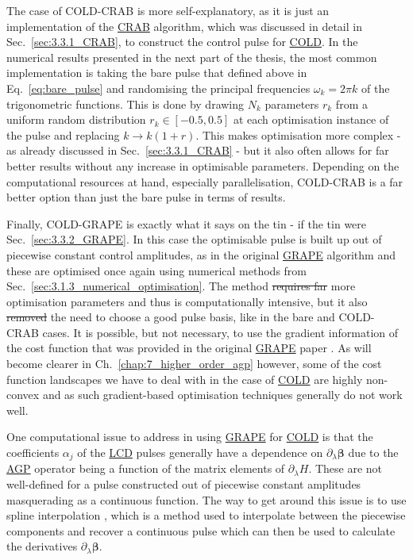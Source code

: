 \documentclass[a4paper,oneside,11pt]{book}
\newcommand{\betabb}{\boldsymbol{\beta}}
\newcommand{\dlambda}{\partial_{\lambda}}
\newcommand{\acrref}[1]{\hyperref[acr:#1]{#1}}
\providecommand{\DIFaddtex}[1]{{\protect\color{blue}\uwave{#1}}} %
\providecommand{\DIFdeltex}[1]{{\protect\color{red}\sout{#1}}}                      %
\providecommand{\DIFaddbegin}{} %
\providecommand{\DIFaddend}{} %
\providecommand{\DIFdelbegin}{} %
\providecommand{\DIFdelend}{} %
\providecommand{\DIFadd}[1]{\texorpdfstring{\DIFaddtex{#1}}{#1}} %
\providecommand{\DIFdel}[1]{\texorpdfstring{\DIFdeltex{#1}}{}} %
\newcommand{\DIFscaledelfig}{0.5}
\newlength{\DIFdelgraphicswidth} %
\newlength{\DIFdelgraphicsheight} %
\newcommand{\DIFaddincludegraphics}[2][]{{\color{blue}\fbox{\DIFOincludegraphics[#1]{#2}}}} %
\newcommand{\DIFdelincludegraphics}[2][]{%
\sbox{\DIFdelgraphicsbox}{\DIFOincludegraphics[#1]{#2}}%
\settoboxwidth{\DIFdelgraphicswidth}{\DIFdelgraphicsbox} %
\settoboxtotalheight{\DIFdelgraphicsheight}{\DIFdelgraphicsbox} %
\scalebox{\DIFscaledelfig}{%
\parbox[b]{\DIFdelgraphicswidth}{\usebox{\DIFdelgraphicsbox}\\[-\baselineskip] \rule{\DIFdelgraphicswidth}{0em}}\llap{\resizebox{\DIFdelgraphicswidth}{\DIFdelgraphicsheight}{%
\setlength{\unitlength}{\DIFdelgraphicswidth}%
\begin{picture}(1,1)%
\thicklines\linethickness{2pt} %
{\color[rgb]{1,0,0}\put(0,0){\framebox(1,1){}}}%
{\color[rgb]{1,0,0}\put(0,0){\line( 1,1){1}}}%
{\color[rgb]{1,0,0}\put(0,1){\line(1,-1){1}}}%
\end{picture}%
}\hspace*{3pt}}} %
} %
\DeclareRobustCommand{\DIFaddbegin}{\DIFOaddbegin \let\includegraphics\DIFaddincludegraphics} %
\DeclareRobustCommand{\DIFaddend}{\DIFOaddend \let\includegraphics\DIFOincludegraphics} %
\DeclareRobustCommand{\DIFdelbegin}{\DIFOdelbegin \let\includegraphics\DIFdelincludegraphics} %
\DeclareRobustCommand{\DIFdelend}{\DIFOaddend \let\includegraphics\DIFOincludegraphics} %
\begin{document}
The case of COLD-CRAB is more self-explanatory, as it is just an implementation of the \acrref{CRAB} algorithm, which was discussed in detail in Sec.~\ref{sec:3.3.1_CRAB}, to construct the control pulse for \acrref{COLD}. In the numerical results presented in the next part of the thesis, the most common implementation is taking the bare pulse that defined above in Eq.~\eqref{eq:bare_pulse} and randomising the principal frequencies $\omega_k = 2 \pi k$ of the trigonometric functions. This is done by drawing \DIFdelbegin \DIFdel{$N_k$ }\DIFdelend parameters $r_k$ from a uniform random distribution $r_k \in [-0.5,0.5]$ at each optimisation instance of the pulse and replacing \DIFdelbegin \DIFdel{$k \rightarrow k(1+r)$}\DIFdelend \DIFaddbegin \DIFadd{$k \rightarrow k(1+r_k)$}\DIFaddend . This makes optimisation more complex - as already discussed in Sec.~\ref{sec:3.3.1_CRAB} - but it also often allows for far better results without any increase in optimisable parameters. Depending on the computational resources at hand, especially parallelisation, COLD-CRAB is a far better option than just the bare pulse in terms of results.

Finally, COLD-GRAPE is exactly what it says on the tin - if the tin were Sec.~\ref{sec:3.3.2_GRAPE}. In this case the optimisable pulse is built up out of piecewise constant control amplitudes, as in the original \acrref{GRAPE} algorithm and these are optimised once again using numerical methods from Sec.~\ref{sec:3.1.3_numerical_optimisation}. The method \DIFdelbegin \DIFdel{requires far }\DIFdelend \DIFaddbegin \DIFadd{generally requires }\DIFaddend more optimisation parameters and thus is computationally intensive, but it also \DIFdelbegin \DIFdel{removed }\DIFdelend \DIFaddbegin \DIFadd{removes }\DIFaddend the need to choose a good pulse basis, like in the bare and COLD-CRAB cases. It is possible, but not necessary, to use the gradient information of the cost function that was provided in the original \acrref{GRAPE} paper \cite{khaneja_optimal_2005}. As will become clearer in Ch.~\ref{chap:7_higher_order_agp} however, some of the cost function landscapes we have to deal with in the case of \acrref{COLD} are highly non-convex and as such gradient-based optimisation techniques generally do not work well. 

One computational issue to address in using \acrref{GRAPE} for \acrref{COLD} is that the coefficients $\alpha_j$ of the \acrref{LCD} pulses generally have a dependence on $\dlambda \betabb$ due to the \acrref{AGP} operator being a function of the matrix elements of $\dlambda H$. These are not well-defined for a pulse constructed out of piecewise constant amplitudes masquerading as a continuous function. The way to get around this issue is to use spline interpolation \cite{noauthor_spline_nodate}, which is a method used to interpolate between the piecewise components and recover a continuous pulse which can then be used to calculate the derivatives $\dlambda \betabb$. 
\end{document}
